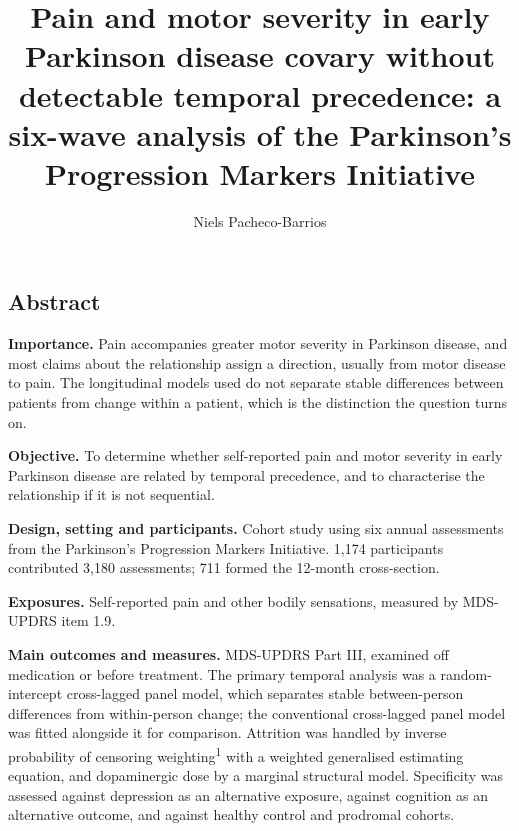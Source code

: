 \documentclass[
  english,
  12pt,
]{article}
\title{Pain and motor severity in early Parkinson disease covary without detectable temporal precedence: a six-wave analysis of the Parkinson's Progression Markers Initiative}
\author{Niels Pacheco-Barrios}
\date{}
\begin{document}
\maketitle

\subsection{Abstract}\label{abstract}

\textbf{Importance.} Pain accompanies greater motor severity in Parkinson disease, and most claims about the relationship assign a direction, usually from motor disease to pain. The longitudinal models used do not separate stable differences between patients from change within a patient, which is the distinction the question turns on.

\textbf{Objective.} To determine whether self-reported pain and motor severity in early Parkinson disease are related by temporal precedence, and to characterise the relationship if it is not sequential.

\textbf{Design, setting and participants.} Cohort study using six annual assessments from the Parkinson's Progression Markers Initiative. 1,174 participants contributed 3,180 assessments; 711 formed the 12-month cross-section.

\textbf{Exposures.} Self-reported pain and other bodily sensations, measured by MDS-UPDRS item 1.9.

\textbf{Main outcomes and measures.} MDS-UPDRS Part III, examined off medication or before treatment. The primary temporal analysis was a random-intercept cross-lagged panel model, which separates stable between-person differences from within-person change; the conventional cross-lagged panel model was fitted alongside it for comparison. Attrition was handled by inverse probability of censoring weighting\textsuperscript{1} with a weighted generalised estimating equation, and dopaminergic dose by a marginal structural model. Specificity was assessed against depression as an alternative exposure, against cognition as an alternative outcome, and against healthy control and prodromal cohorts.
\end{document}
